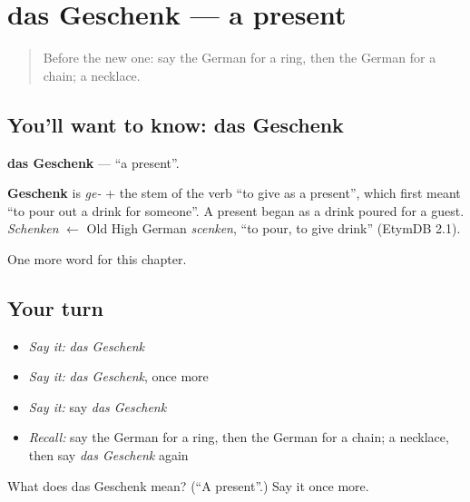 \section[das Geschenk]{das Geschenk — a present}

\label{lesson:GE-C117-geschenk}



\begin{quote}
Before the new one: say the German for a ring, then the German for a chain; a necklace.
\end{quote}

\subsection*{You'll want to know: das Geschenk}
\textbf{das Geschenk} — \textquotedblleft{}a present\textquotedblright{}.

\begin{cousinweb}
\textbf{Geschenk} is \emph{ge-} + the stem of the verb \textquotedblleft{}to give as a present\textquotedblright{}, which first meant \textquotedblleft{}to pour out a drink for someone\textquotedblright{}. A present began as a drink poured for a guest. \emph{Schenken} $\leftarrow$ Old High German \emph{scenken}, \textquotedblleft{}to pour, to give drink\textquotedblright{} (EtymDB 2.1).
\end{cousinweb}

\begin{grammarlens}[title={What you've built}]
One more word for this chapter.
\end{grammarlens}

\subsection*{Your turn}
\begin{itemize}
\raggedright
  \item \emph{Say it:} \emph{das Geschenk}
  \item \emph{Say it:} \emph{das Geschenk}, once more
  \item \emph{Say it:} say \emph{das Geschenk}
  \item \emph{Recall:} say the German for a ring, then the German for a chain; a necklace, then say \emph{das Geschenk} again
\end{itemize}

\begin{tcolorbox}[breakable,colback=teal!4,colframe=teal!35!black,title={Before you move on}]
What does das Geschenk mean? (\textquotedblleft{}A present\textquotedblright{}.) Say it once more.
\end{tcolorbox}
